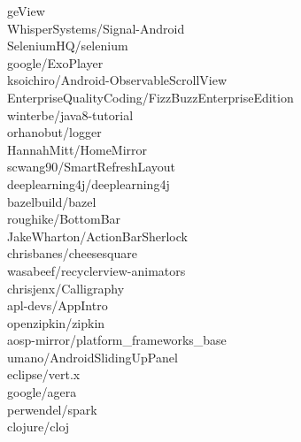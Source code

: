 \documentclass[twoside]{praca}
\begin{document}
\begin{multicols}{3}
geView\\WhisperSystems/Signal-Android\\SeleniumHQ/selenium\\google/ExoPlayer\\ksoichiro/Android-Observable\-ScrollView\\EnterpriseQualityCoding/\-Fizz\-Buzz\-Enterprise\-Edition\\winterbe/java8-tutorial\\orhanobut/logger\\HannahMitt/HomeMirror\\scwang90/SmartRefresh\-Layout\\deeplearning4j/deep\-learning4j\\bazelbuild/bazel\\roughike/BottomBar\\JakeWharton/ActionBar\-Sherlock\\chrisbanes/cheesesquare\\wasabeef/recyclerview-animators\\chrisjenx/Calligraphy\\apl-devs/AppIntro\\openzipkin/zipkin\\aosp-mirror/platform\_\-frameworks\_\-base\\umano/AndroidSliding\-Up\-Panel\\eclipse/vert.x\\google/agera\\perwendel/spark\\clojure/cloj
\end{multicols}
\end{document}
